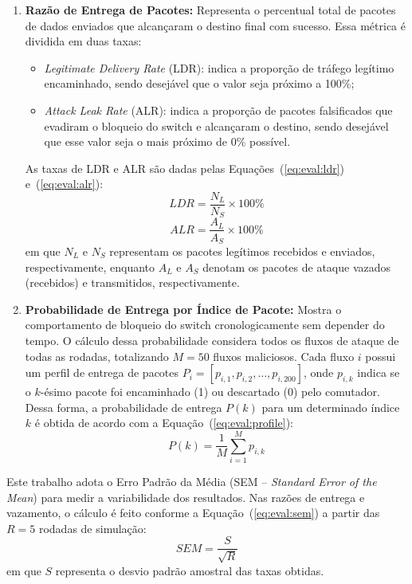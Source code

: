\documentclass[12pt]{article}
\begin{document}
\begin{enumerate}
    \item \textbf{Razão de Entrega de Pacotes:} Representa o percentual total de pacotes de dados enviados
    que alcançaram o destino final com sucesso. Essa métrica é dividida em duas taxas:
    \begin{itemize}
        \item \textit{Legitimate Delivery Rate} (LDR): indica a proporção de tráfego legítimo encaminhado,
        sendo desejável que o valor seja próximo a 100\%;
        \item \textit{Attack Leak Rate} (ALR): indica a proporção de pacotes falsificados que evadiram
        o bloqueio do switch e alcançaram o destino, sendo desejável que esse valor seja o mais próximo de 0\% possível.
    \end{itemize}
    As taxas de LDR e ALR são dadas pelas Equações~(\ref{eq:eval:ldr}) e~(\ref{eq:eval:alr}):
    \begin{equation}
        LDR = \frac{N_{L}}{N_{S}} \times 100\%
        \label{eq:eval:ldr}
    \end{equation}
    \begin{equation}
        ALR = \frac{A_{L}}{A_{S}} \times 100\%
        \label{eq:eval:alr}
    \end{equation}
    em que $N_{L}$ e $N_{S}$ representam os pacotes legítimos recebidos e enviados, respectivamente,
    enquanto $A_{L}$ e $A_{S}$ denotam os pacotes de ataque vazados (recebidos) e transmitidos, respectivamente.

    \item \textbf{Probabilidade de Entrega por Índice de Pacote:} Mostra o comportamento de bloqueio do switch
    cronologicamente sem depender do tempo.
    O cálculo dessa probabilidade considera todos os fluxos de ataque de todas as rodadas, totalizando $M = 50$ fluxos maliciosos.
    Cada fluxo $i$ possui um perfil de entrega de pacotes $P_i = [p_{i,1}, p_{i,2}, \dots, p_{i,200}]$,
    onde $p_{i,k}$ indica se o $k$-ésimo pacote foi encaminhado (1) ou descartado (0) pelo comutador.
    Dessa forma, a probabilidade de entrega $P(k)$ para um determinado índice $k$ é obtida de acordo com a Equação~(\ref{eq:eval:profile}):
    \begin{equation}
        P(k) = \frac{1}{M} \sum_{i=1}^{M} p_{i,k}
        \label{eq:eval:profile}
    \end{equation}
\end{enumerate}

Este trabalho adota o Erro Padrão da Média (SEM -- \textit{Standard Error of the Mean}) para medir a variabilidade dos resultados.
Nas razões de entrega e vazamento, o cálculo é feito conforme a Equação~(\ref{eq:eval:sem}) a partir das $R = 5$ rodadas de simulação:
\begin{equation}
    SEM = \frac{S}{\sqrt{R}}
    \label{eq:eval:sem}
\end{equation}
em que $S$ representa o desvio padrão amostral das taxas obtidas.
\end{document}
